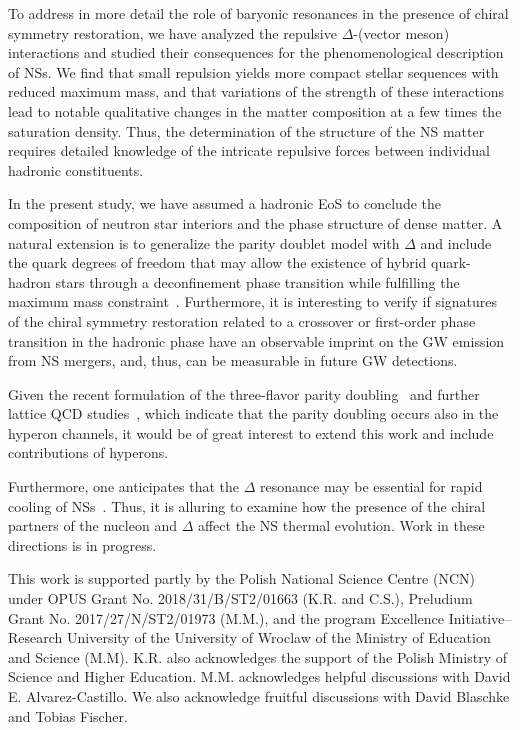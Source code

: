 \documentclass[preprint,showkeys,lengthcheck,nofootinbib,twocolumn,notitlepage,floatfix,superscriptaddress]{revtex4-1}
\begin{document}
To address in more detail the role of baryonic resonances in the presence of chiral symmetry restoration, we have analyzed the repulsive $\Delta$-(vector meson) interactions and studied their consequences for the phenomenological description of NSs. We find that small repulsion yields more compact stellar sequences with reduced maximum mass, and that variations of the strength of these interactions lead to notable qualitative changes in the matter composition at a few times the saturation density. Thus, the determination of the structure of the  NS matter requires detailed knowledge of the intricate repulsive forces between individual hadronic constituents.

In the present study, we have assumed a hadronic EoS to conclude the composition of neutron star interiors and the phase structure of dense matter. A natural extension is to generalize the parity doublet model with $\Delta$ and include the quark degrees of freedom that may allow the existence of hybrid quark-hadron stars through a deconfinement phase transition while fulfilling the maximum mass constraint~\cite{Marczenko:2020jma}. Furthermore, it is interesting to verify if signatures of the chiral symmetry restoration related to a crossover or first-order phase transition in the hadronic phase have an observable imprint on the GW emission from NS mergers, and, thus, can be measurable in future GW detections.

Given the recent formulation of the three-flavor parity doubling~\cite{Steinheimer:2011ea, Sasaki:2017glk} and further lattice QCD studies~\cite{Aarts:2015mma, Aarts:2017rrl}, which indicate  that the parity doubling occurs also in the hyperon channels, it would be of great interest to extend this work and include contributions of hyperons. 

Furthermore, one anticipates that the $\Delta$ resonance may be essential for rapid cooling of NSs~\cite{Prakash:1992zng}. Thus, it is alluring to examine how the presence of the chiral partners of the nucleon and $\Delta$ affect the NS thermal evolution. Work in these directions is in progress.

\begin{acknowledgements}
This work is supported partly by the Polish National Science Centre (NCN) under OPUS Grant No. 2018/31/B/ST2/01663 (K.R. and C.S.), Preludium Grant No. 2017/27/N/ST2/01973 (M.M.), and the program Excellence Initiative–Research University of the University of Wroclaw of the Ministry of Education and Science (M.M). K.R. also acknowledges the support of the Polish Ministry of Science and Higher Education. M.M. acknowledges helpful discussions with David E. Alvarez-Castillo. We also acknowledge fruitful discussions with David Blaschke and Tobias Fischer.  
\end{acknowledgements}



\end{document}
